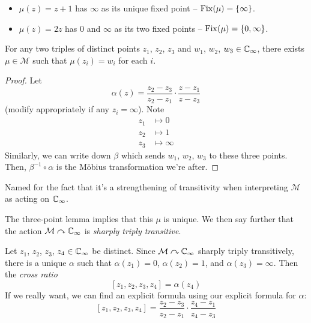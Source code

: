 \documentclass{../template/note}
\begin{document}
    \begin{example*}
        \begin{itemize}
            \item \(\mu(z) = z+1\) has \(\infty\) as its unique fixed point -- \(\operatorname{Fix}(\mu) = \{\infty\}\).
            \item \(\mu(z) = 2z\) has 0 and \(\infty\) as its two fixed points -- \(\operatorname{Fix}(\mu) = \{0, \infty\}\).
        \end{itemize}
    \end{example*}
    
    \begin{lemma}
        For any two triples of distinct points \(z_1\), \(z_2\), \(z_3\) and \(w_1\), \(w_2\), \(w_3 \in \mathbb C_\infty\), there exists \(\mu \in \mathcal M\) such that \(\mu(z_i) = w_i\) for each \(i\).
    \end{lemma}
    
    \begin{proof}
        Let
        \[
            \alpha(z) = \frac{z_2-z_3}{z_2-z_1} \cdot \frac{z-z_1}{z-z_3}
        \]
        (modify appropriately if any \(z_i = \infty\)). Note
        \begin{align*}
            z_1 &\longmapsto 0 \\
            z_2 &\longmapsto 1 \\
            z_3 &\longmapsto \infty
        \end{align*}
        Similarly, we can write down \(\beta\) which sends \(w_1\), \(w_2\), \(w_3\) to these three points. Then, \(\beta^{-1} \circ \alpha\) is the M\"obius transformation we're after.
        
    \end{proof}
    
    \begin{remark*}
        Named for the fact that it's a strengthening of transitivity when interpreting \(\mathcal M\) as acting on \(\mathbb C_\infty\).
    \end{remark*}
    
    \begin{remark*}
        The three-point lemma implies that this \(\mu\) is unique. We then say further that the action \(\mathcal M \curvearrowright \mathbb C_\infty\) is \emph{sharply triply transitive}.
    \end{remark*}
    
    \begin{definition}
        Let \(z_1\), \(z_2\), \(z_3\), \(z_4 \in \mathbb C_\infty\) be distinct. Since \(\mathcal M \curvearrowright \mathbb C_\infty\) sharply triply transitively, there is a unique \(\alpha\) such that \(\alpha(z_1) = 0\), \(\alpha(z_2) = 1\), and \(\alpha(z_3) = \infty\). Then the \emph{cross ratio}
        \[
            [z_1, z_2, z_3, z_4] = \alpha(z_4)
        \]
        If we really want, we can find an explicit formula using our explicit formula for \(\alpha\):
        \[
            [z_1, z_2, z_3, z_4] = \frac{z_2-z_3}{z_2-z_1} \cdot \frac{z_4-z_1}{z_4-z_3}
        \]
    \end{definition}
    
\end{document}
